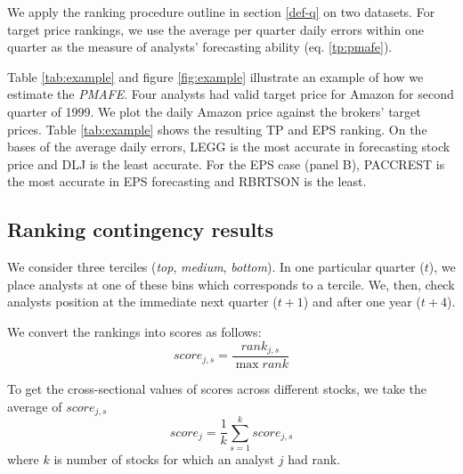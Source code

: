 \documentclass{article}
\begin{document}
We apply the ranking procedure outline in section \ref{def-q} on two datasets. For target price rankings, we use the average per quarter daily errors within one quarter as the measure of analysts' forecasting ability (eq. \ref{tp:pmafe}). 

Table \ref{tab:example} and figure \ref{fig:example} illustrate an example of how we estimate the \textit{PMAFE}. Four analysts had valid target price for Amazon for second quarter of 1999. We plot the daily Amazon price against the brokers' target prices. Table \ref{tab:example} shows the resulting TP and EPS ranking. On the bases of the average daily errors, LEGG is the most accurate in forecasting stock price and  DLJ is the least accurate. For the EPS case (panel B), PACCREST is the most accurate in EPS forecasting and RBRTSON is the least. 


\subsection{Ranking contingency results}
We consider  three terciles (\textit{top}, \textit{medium}, \textit{bottom}). In one particular quarter ($t$), we place  analysts at one of these bins which corresponds to a tercile. We, then,  check analysts position at the immediate next quarter ($t+1$) and after one year ($t+4$).   

We convert the rankings into scores as follows:
\begin{equation}
\label{eq:score}
score_{j,s}=\frac{rank_{j,s}}{\max{rank}}
\end{equation}

To get the cross-sectional values of scores across different stocks, we take the average of $score_{j,s}$
\begin{equation}
\label{eq:mean-score}
score_{j}= \frac{1}{k} \sum_{s=1}^{k} score_{j,s}
\end{equation}
where $k$ is number of stocks for which an analyst $j$ had rank. 
\end{document}
